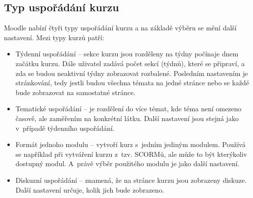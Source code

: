 \documentclass[
print,
  11pt,
  table,   
  nolof,    
  nolot,
  oneside,final
]{fithesis3}
\begin{document}
\subsection*{Typ uspořádání kurzu}
Moodle nabízí čtyři typy uspořádání kurzu a na základě výběru se mění další nastavení. Mezi typy kurzů patří:
\begin{itemize}
	\item Týdenní uspořádání -- sekce kurzu jsou rozděleny na týdny počínaje dnem začátku kurzu. Dále uživatel zadává počet sekcí (týdnů), které se připraví, a zda se budou neaktivní týdny zobrazovat rozbalené. Posledním nastavením je stránkování, tedy jestli budou všechna témata na jedné stránce nebo se každé bude zobrazovat na samostatné stránce.
	\item Tematické uspořádání -- je rozdělení do více témat, kde téma není omezeno časově, ale zaměřením na konkrétní látku. Další nastavení jsou stejná jako v~případě týdenního uspořádání.
	\item Formát jednoho modulu -- vytvoří kurz s~jedním jediným modulem. Používá se například při vytváření kurzu z~tzv. SCORMů, ale může to být kterýkoliv dostupný modul. A~právě výběr použitého modulu je jako další nastavení.
	\item Diskuzní uspořádání -- znamená, že na stránce kurzu jsou zobrazeny diskuze. Další nastavení určuje, kolik jich bude zobrazeno.
\end{itemize}
\end{document}
